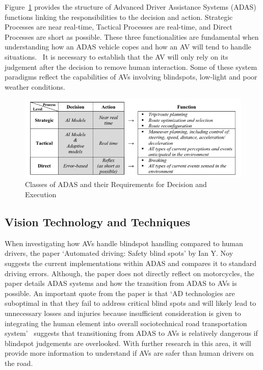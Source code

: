 \documentclass[conference]{IEEEtran}
\begin{document}
		Figure~\ref{fig:adasFunctionsIonita} provides the structure of Advanced Driver Assistance Systems (ADAS) functions linking the responsibilities to the decision and action. Strategic Processes are near real-time, Tactical Processes are real-time, and Direct Processes are short as possible. These three functionalities are fundamental when understanding how an ADAS vehicle copes and how an AV will tend to handle situations.~\cite{ionita_autonomous_2017} It is necessary to establish that the AV will only rely on its judgement after the decision to remove human interaction. Some of these system paradigms reflect the capabilities of AVs involving blindspots, low-light and poor weather conditions.
		\begin{figure}[h]
			\centering
			\includegraphics[width=\columnwidth]{Figures/SystemFunctionality-3.png}
			\caption{Classes of ADAS and their Requirements for Decision and Execution~\cite{ionita_autonomous_2017}}
			\label{fig:adasFunctionsIonita}
		\end{figure}

	\subsection{Vision Technology and Techniques}
		When investigating how AVs handle blindspot handling compared to human drivers, the paper `Automated driving: Safety blind spots' by Ian Y. Noy~\cite{noy_automated_2018} suggests the current implementations within ADAS and compares it to standard driving errors. Although, the paper does not directly reflect on motorcycles, the paper details ADAS systems and how the transition from ADAS to AVs is possible. An important quote from the paper is that `AD technologies are suboptimal in that they fail to address critical blind spots and will likely lead to unnecessary losses and injuries because insufficient consideration is given to integrating the human element into overall sociotechnical road transportation system'~\cite{noy_automated_2018} suggests that transitioning from ADAS to AVs is relatively dangerous if blindspot judgements are overlooked. With further research in this area, it will provide more information to understand if AVs are safer than human drivers on the road.
\end{document}
